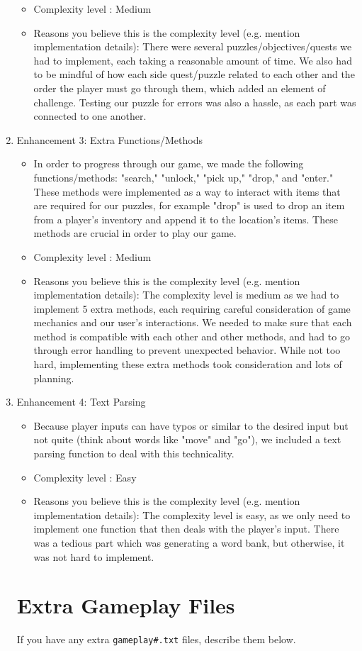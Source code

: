 \documentclass[11pt]{article}
\begin{document}
\begin{enumerate}
\begin{itemize}
    \item Complexity level : Medium
    \item Reasons you believe this is the complexity level (e.g. mention implementation details):
    There were several puzzles/objectives/quests we had to implement, each taking a reasonable amount of time. We also had to be mindful of how each side quest/puzzle related to each other and the order the player must go through them, which added an element of challenge. Testing our puzzle for errors was also a hassle, as each part was connected to one another.
    \end{itemize}

\item Enhancement 3: Extra Functions/Methods
    \begin{itemize}
    \item In order to progress through our game, we made the following functions/methods: "search," "unlock," "pick up," "drop," and "enter." These methods were implemented as a way to interact with items that are required for our puzzles, for example "drop" is used to drop an item from a player's inventory and append it to the location's items. These methods are crucial in order to play our game.

    \item Complexity level : Medium
    \item Reasons you believe this is the complexity level (e.g. mention implementation details):
    The complexity level is medium as we had to implement 5 extra methods, each requiring careful consideration of game mechanics and our user's interactions. We needed to make sure that each method is compatible with each other and other methods, and had to go through error handling to prevent unexpected behavior. While not too hard, implementing these extra methods took consideration and lots of planning.
 
\end{itemize}

\item Enhancement 4: Text Parsing
    \begin{itemize}
    \item Because player inputs can have typos or similar to the desired input but not quite (think about words like "move" and "go"), we included a text parsing function to deal with this technicality.

    \item Complexity level : Easy
    \item Reasons you believe this is the complexity level (e.g. mention implementation details):
    The complexity level is easy, as we only need to implement one function that then deals with the player's input. There was a tedious part which was generating a word bank, but otherwise, it was not hard to implement.
\end{itemize}

\section*{Extra Gameplay Files}

If you have any extra \texttt{gameplay\#.txt} files, describe them below.

\end{enumerate}
\end{document}
